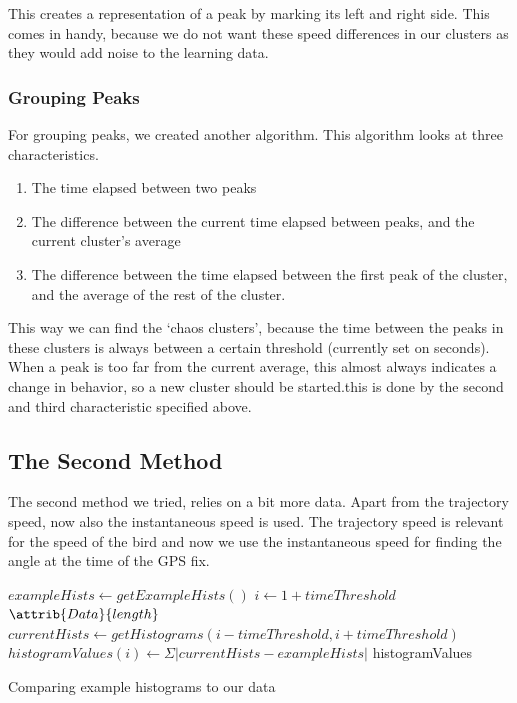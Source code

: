  This creates a representation of a peak by marking its left and right side.
 This comes in handy, because we do not want these speed differences in our
 clusters as they would add noise to the learning data.

 \subsubsection{Grouping Peaks}
 For grouping peaks, we created another algorithm. This algorithm looks at three
 characteristics.  
 \begin{enumerate}
 \item The time elapsed between two peaks
 \item The difference between the current time elapsed between peaks, and the
 current cluster's average
 \item The difference between the time elapsed between the first peak of the
 cluster, and the average of the rest of the cluster.
 \end{enumerate}
 This way we can find the `chaos clusters', because the time between the peaks
 in these clusters is always between a certain threshold (currently set on
 \timeThreshold seconds). 
 When a peak is too far from the  current average, this almost always indicates
 a change in behavior, so a new cluster should be started.this is done by the
 second and third characteristic specified above.

\subsection{The Second Method}
The second method we tried, relies on a bit more data. Apart from the trajectory
speed, now also the instantaneous speed is used. The trajectory speed is relevant for
the speed of the bird and now we use the instantaneous speed for finding the angle
at the time of the GPS fix. 

\begin{algorithm}
\begin{codebox}
\li $exampleHists \gets getExampleHists()$
\li \For $i \gets 1 + timeThreshold$ \To $\attrib{Data}{length}$ 
\li \Do
    $currentHists \gets getHistograms(i-timeThreshold, i+timeThreshold)$
    \li $histogramValues(i) \gets \Sigma \left| currentHists - exampleHists \right|$
\End
\li \Return histogramValues
\end{codebox}
\caption{Comparing example histograms to our data}
\label{alg:hist}
\end{algorithm}

